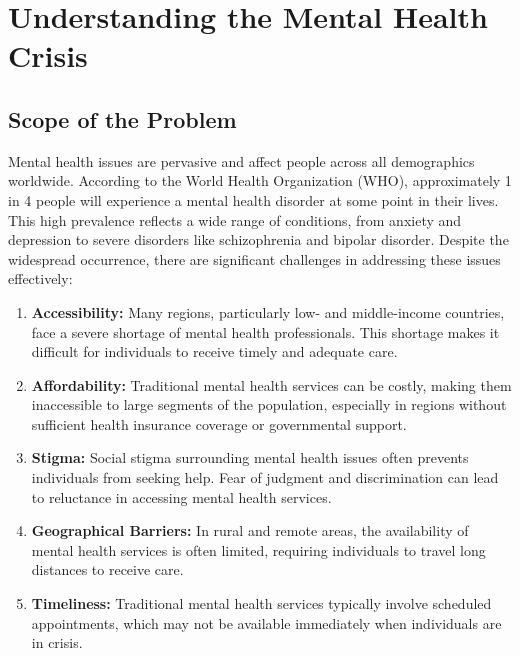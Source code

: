 \section{Understanding the Mental Health Crisis}

\subsection{Scope of the Problem}
Mental health issues are pervasive and affect people across all demographics worldwide. According to the World Health Organization (WHO), approximately 1 in 4 people will experience a mental health disorder at some point in their lives. This high prevalence reflects a wide range of conditions, from anxiety and depression to severe disorders like schizophrenia and bipolar disorder. Despite the widespread occurrence, there are significant challenges in addressing these issues effectively:
\begin{enumerate}
    \item \textbf{Accessibility:} Many regions, particularly low- and middle-income countries, face a severe shortage of mental health professionals. This shortage makes it difficult for individuals to receive timely and adequate care.
    \item \textbf{Affordability:} Traditional mental health services can be costly, making them inaccessible to large segments of the population, especially in regions without sufficient health insurance coverage or governmental support.
    \item \textbf{Stigma:} Social stigma surrounding mental health issues often prevents individuals from seeking help. Fear of judgment and discrimination can lead to reluctance in accessing mental health services.
    \item \textbf{Geographical Barriers:} In rural and remote areas, the availability of mental health services is often limited, requiring individuals to travel long distances to receive care.
    \item \textbf{Timeliness:} Traditional mental health services typically involve scheduled appointments, which may not be available immediately when individuals are in crisis.
\end{enumerate}

